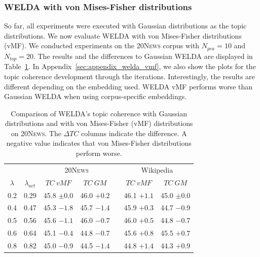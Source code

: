 \documentclass[
        a4paper,
        titlepage,
        twoside,
        parskip
        ]{scrbook}
\newcommand{\ra}[1]{\renewcommand{\arraystretch}{#1}}
\theoremstyle{break}
\begin{document}
\subsubsection{WELDA with von Mises-Fisher distributions}

So far, all experiments were executed with Gaussian distributions as the topic distributions.
We now evaluate WELDA with von Mises-Fisher distributions (vMF).
We conducted experiments on the \textsc{20News} corpus with $N_{pca} = 10$ and $N_{top} = 20$.
The results and the differences to Gaussian WELDA are displayed in Table~\ref{table:welda_vmf}.
In Appendix~\ref{sec:appendix_welda_vmf}, we also show the plots for the topic coherence development through the iterations.
Interestingly, the results are different depending on the embedding used.
WELDA vMF performs worse than Gaussian WELDA when using corpus-specific embeddings.

\begin{table}[]
  \ra{1.3}
  \centering
  \caption{Comparison of WELDA's topic coherence with Gaussian distributions and with von Mises-Fisher (vMF) distributions on \textsc{20News}. The $\Delta TC$ columns indicate the difference. A negative value indicates that von Mises-Fisher distributions perform worse.}
  \label{table:welda_vmf}
  \begin{tabular}{@{}ccccccc@{}}
    \toprule
                     &                 & \multicolumn{2}{c}{\textsc{20News}} && \multicolumn{2}{c}{Wikipedia} \\
           \cmidrule{3-4} \cmidrule{6-7}
           $\lambda$ & $\lambda_{act}$ & $TC~vMF$        & $TC~GM$ &           & $TC~vMF$         & $TC~GM$      \\
           \midrule
           0.2       & 0.29            & 45.8 $\pm 0.0$  & 46.0 $+0.2$    && 46.1   $+1.1$  & 45.0 $\pm 0.0$ \\
           0.4       & 0.47            & 45.3 $-1.8$     & 45.7 $-1.4$    && 45.9   $+0.3$  & 44.7 $-0.9$     \\
           0.5       & 0.56            & 45.6 $-1.1$     & 46.0 $-0.7$    && 46.0   $+0.5$  & 44.8 $-0.7$     \\
           0.6       & 0.64            & 45.1 $-0.4$     & 44.8 $-0.7$    && 45.6   $+0.8$  & 45.5 $+0.7$     \\
           0.8       & 0.82            & 45.0 $-0.9$     & 44.5 $-1.4$    && 44.8   $+1.4$  & 44.3 $+0.9$     \\ \bottomrule
  \end{tabular}
\end{table}
\end{document}
